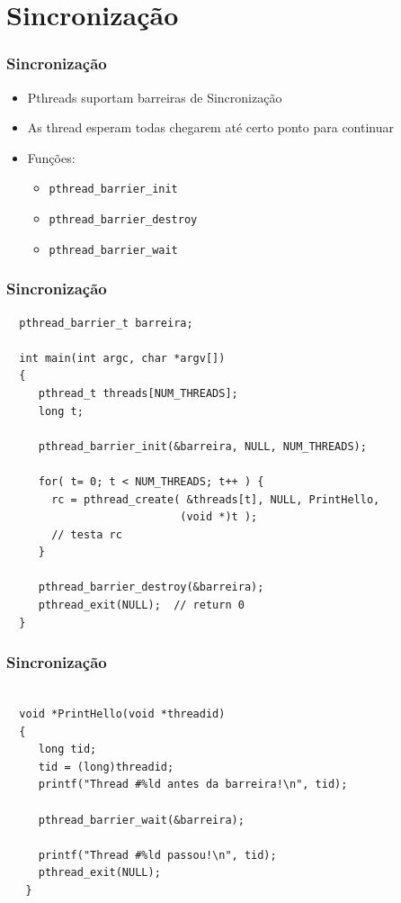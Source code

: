 \documentclass[xcolor=dvipsnames,11pt,presentation,aspectratio=169]{beamer}
\begin{document}
\section{Sincronização}
\begin{frame}
  \frametitle{Sincronização}
  \begin{itemize}
  \item Pthreads suportam barreiras de Sincronização
  \item As thread esperam todas chegarem até certo ponto para continuar
  \item Funções:
    \begin{itemize}
      \item \texttt{pthread\_barrier\_init}
      \item \texttt{pthread\_barrier\_destroy}
      \item \texttt{pthread\_barrier\_wait}
    \end{itemize}
  \end{itemize}
\end{frame}
\begin{frame}[fragile]
  \frametitle{Sincronização}
  \vspace{-5mm}
\begin{lstlisting}
  pthread_barrier_t barreira;

  int main(int argc, char *argv[])
  {
     pthread_t threads[NUM_THREADS];
     long t;

     pthread_barrier_init(&barreira, NULL, NUM_THREADS);

     for( t= 0; t < NUM_THREADS; t++ ) {
       rc = pthread_create( &threads[t], NULL, PrintHello,
                           (void *)t );
       // testa rc
     }

     pthread_barrier_destroy(&barreira);
     pthread_exit(NULL);  // return 0
  }
\end{lstlisting}
\end{frame}
\begin{frame}[fragile]
  \frametitle{Sincronização}
  \vspace{-5mm}
\begin{lstlisting}

  void *PrintHello(void *threadid)
  {
     long tid;
     tid = (long)threadid;
     printf("Thread #%ld antes da barreira!\n", tid);

     pthread_barrier_wait(&barreira);

     printf("Thread #%ld passou!\n", tid);
     pthread_exit(NULL);
   }
  
\end{lstlisting}
\end{frame}
\end{document}
